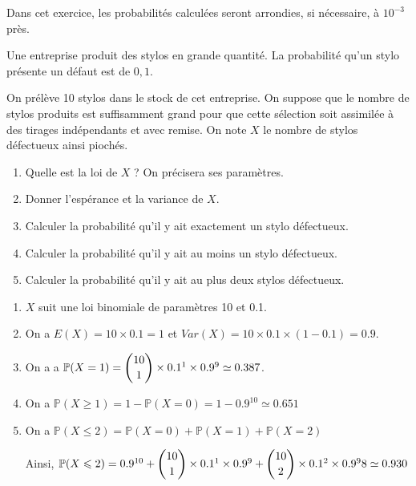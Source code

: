\documentclass[11pt,fleqn, openany]{book} %
\begin{document}
\begin{exercise}Dans cet exercice, les probabilités calculées seront arrondies, si nécessaire, à $10^{-3}$ près.

Une entreprise produit des stylos en grande quantité. La probabilité qu'un stylo présente un défaut est de $0,1$.


On prélève 10 stylos dans le stock de cet entreprise. On suppose que le nombre de stylos produits est suffisamment grand pour que cette sélection soit assimilée à des tirages indépendants et avec remise. On note $X$ le nombre de stylos défectueux ainsi piochés.
\begin{enumerate}
\item Quelle est la loi de $X$ ? On précisera ses paramètres.
\item Donner l'espérance et la variance de $X$.
\item Calculer la probabilité qu'il y ait exactement un stylo défectueux.
\item Calculer la probabilité qu'il y ait au moins un stylo défectueux.
\item Calculer la probabilité qu'il y ait au plus deux stylos défectueux.
\end{enumerate}\newpage \end{exercise}

\begin{solution}\hspace{0pt}
\begin{enumerate}
\item $X$ suit une loi binomiale de paramètres 10 et 0.1.
\item On a $E(X)=10 \times 0.1 = 1$ et $Var(X)=10 \times 0.1 \times (1-0.1)=0.9$.
\item On a a $\mathbb{P}(X=1)=\dbinom{10}{1} \times 0.1^1 \times 0.9 ^9 \simeq 0.387$.
\item On a $\mathbb{P}(X \geqslant 1)=1-\mathbb{P}(X=0)=1-0.9^{10}\simeq 0.651$
\item  On a $\mathbb{P}(X\leqslant 2)=\mathbb{P}(X=0) + \mathbb{P}(X=1) + \mathbb{P}(X=2)$

Ainsi, $\mathbb{P}(X\leqslant 2) = 0.9^{10}+\dbinom{10}{1} \times 0.1^1 \times 0.9 ^9  + \dbinom{10}{2} \times 0.1^2 \times 0.9 ^98 \simeq 0.930$
\end{enumerate}\end{solution}
\end{document}
